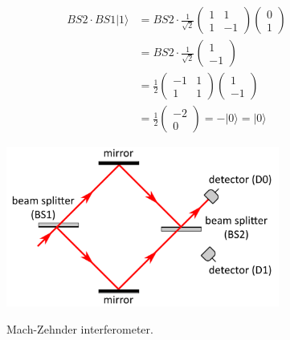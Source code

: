 \begin{equation}
\begin{aligned}
B S 2 \cdot B S 1|1\rangle &=B S 2 \cdot \frac{1}{\sqrt{2}}\left(\begin{array}{cc}
1 & 1 \\
1 & -1
\end{array}\right)\left(\begin{array}{l}
0 \\
1
\end{array}\right) \\
&=B S 2 \cdot \frac{1}{\sqrt{2}}\left(\begin{array}{c}
1 \\
-1
\end{array}\right) \\
&=\frac{1}{2}\left(\begin{array}{cc}
-1 & 1 \\
1 & 1
\end{array}\right)\left(\begin{array}{c}
1 \\
-1
\end{array}\right) \\
&=\frac{1}{2}\left(\begin{array}{c}
-2 \\
0
\end{array}\right)=-|0\rangle=|0\rangle
\end{aligned}
\end{equation}

\begin{figure}[H]
   \centering
    \includegraphics[width=0.8\textwidth]{lesson6/mach_zehnder.pdf}
    \label{fig: 1}
    
        \caption{Mach-Zehnder interferometer.}
    
\end{figure}

